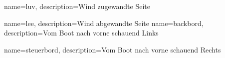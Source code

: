 




{
    name=luv,
    description={Wind zugewandte Seite}
}

{
    name=lee,
    description={Wind abgewandte Seite}
}
{
    name=backbord,
    description={Vom Boot nach vorne schauend Links}
}

{
    name=steuerbord,
    description={Vom Boot nach vorne schauend Rechts}
}